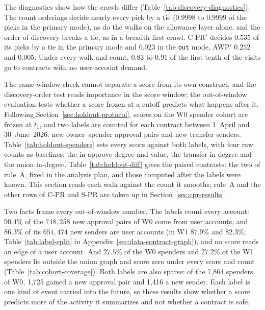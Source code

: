 The diagnostics show how the crawls differ (Table~\ref{tab:discovery-diagnostics}). The count orderings decide nearly every pick by a tie ($0.9998$ to $0.9999$ of the picks in the primary mode), as do the walks on the allowance layer alone, and the order of discovery breaks a tie, as in a breadth-first crawl. \mbox{C-PR}$'$ decides $0.535$ of its picks by a tie in the primary mode and $0.023$ in the \texttt{out} mode, AWP$'$ $0.252$ and $0.005$. Under every walk and count, $0.83$ to $0.91$ of the first tenth of the visits go to contracts with no user-account demand.


The same-window check cannot separate a score from its own construct, and the discovery-order test reads importance in the score window; the out-of-window evaluation tests whether a score frozen at a cutoff predicts what happens after it. Following Section~\ref{sec:holdout-protocol}, scores on the W0 spender cohort are frozen at $t_1$, and two labels are counted for each contract between 1~April and 30~June~2026: new owner--spender approval pairs and new transfer senders. Table~\ref{tab:holdout-spenders} sets every score against both labels, with four raw counts as baselines: the in-approve degree and value, the transfer in-degree and the union in-degree. Table~\ref{tab:holdout-diff} gives the paired contrasts: the two of rule~A, fixed in the analysis plan, and those computed after the labels were known. This section reads each walk against the count it smooths; rule~A and the other rows of \mbox{C-PR} and \mbox{S-PR} are taken up in Section~\ref{sec:cpr-results}.

Two facts frame every out-of-window number. The labels count every account: $90.4\%$ of the $748{,}258$ new approval pairs of W0 come from user accounts, and $86.3\%$ of its $651{,}474$ new senders are user accounts (in W1 $87.9\%$ and $82.3\%$; Table~\ref{tab:label-split} in Appendix~\ref{sec:data-contract-graph}), and no score reads an edge of a user account. And $27.5\%$ of the W0 spenders and $27.2\%$ of the W1 spenders lie outside the union graph and score zero under every score and count (Table~\ref{tab:cohort-coverage}). Both labels are also sparse: of the 7,864 spenders of W0, 1,725 gained a new approval pair and 1,416 a new sender. Each label is one kind of event carried into the future, so these results show whether a score predicts more of the activity it summarizes and not whether a contract is safe.

